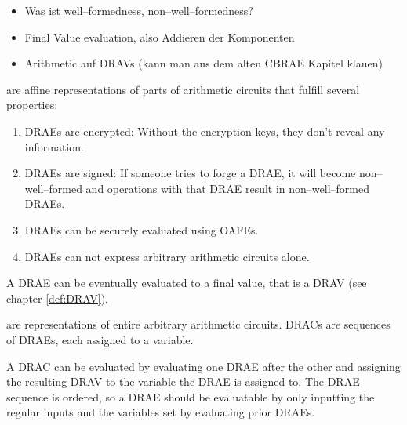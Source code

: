 \begin{JWtodoBox}
  \begin{itemize}
    \item Was ist well--formedness, non--well--formedness?
    \item Final Value evaluation, also Addieren der Komponenten
    \item Arithmetic auf DRAVs (kann man aus dem alten CBRAE Kapitel klauen)
  \end{itemize}
\end{JWtodoBox}


%
%
\label{sec:drae}

 are affine representations of
parts of arithmetic circuits that fulfill several properties:

\begin{enumerate}

  \item \label{prop:drae-encrypted} DRAEs are encrypted: Without the encryption
    keys, they don't reveal any information.

  \item \label{prop:drae-signed} DRAEs are signed: If someone tries to forge a
    DRAE, it will become non--well--formed and operations with that DRAE result
    in non--well--formed DRAEs.

  \item \label{prop:drae-oafe} DRAEs can be securely evaluated using OAFEs.

  \item \label{prop:drae-not-enough} DRAEs can not express arbitrary arithmetic
    circuits alone.

\end{enumerate}

\noindent{}A DRAE can be eventually evaluated to a final value, that is a DRAV
(see chapter \ref{def:DRAV}).


%
%
\label{sec:drac}

 are representations of entire
arbitrary arithmetic circuits. DRACs are sequences of DRAEs, each assigned to a
variable.

\label{sec:DRAC-eval}

A DRAC can be evaluated by evaluating one DRAE after the other and assigning the
resulting DRAV to the variable the DRAE is assigned to. The DRAE sequence is
ordered, so a DRAE should be evaluatable by only inputting the regular inputs
and the variables set by evaluating prior DRAEs.



